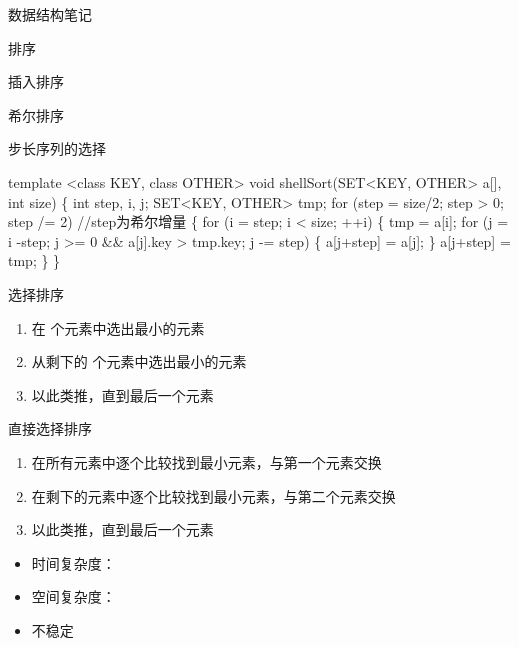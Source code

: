 \documentclass[
  ignorenonframetext,
]{beamer}
\newenvironment{Shaded}{}{}
\newcommand{\NormalTok}[1]{#1}
\providecommand{\tightlist}{%
  \setlength{\itemsep}{0pt}\setlength{\parskip}{0pt}}
\begin{document}
\begin{frame}[fragile]{数据结构笔记}
\begin{block}{排序}
\begin{block}{插入排序}
\begin{block}{希尔排序}
\begin{block}{步长序列的选择}
\begin{Shaded}
\begin{Highlighting}[]
\NormalTok{template \textless{}class KEY, class OTHER\textgreater{}}
\NormalTok{void shellSort(SET\textless{}KEY, OTHER\textgreater{} a[], int size)}
\NormalTok{\{}
\NormalTok{  int step, i, j;}
\NormalTok{  SET\textless{}KEY, OTHER\textgreater{} tmp;}
\NormalTok{  for (step = size/2; step \textgreater{} 0; step /= 2) //step为希尔增量}
\NormalTok{  \{}
\NormalTok{    for (i = step; i \textless{} size; ++i)}
\NormalTok{    \{}
\NormalTok{      tmp = a[i];}
\NormalTok{      for (j = i {-}step; j \textgreater{}= 0 \&\& a[j].key \textgreater{} tmp.key; j {-}= step)}
\NormalTok{      \{}
\NormalTok{        a[j+step] = a[j];}
\NormalTok{      \}}
\NormalTok{      a[j+step] = tmp;}
\NormalTok{    \}}
\NormalTok{\}}
\end{Highlighting}
\end{Shaded}
\end{block}
\end{block}
\end{block}

\begin{block}{选择排序}
\protect{}\label{ux9009ux62e9ux6392ux5e8f}
\begin{enumerate}
\tightlist
\item
  在 {} 个元素中选出最小的元素
\item
  从剩下的 {} 个元素中选出最小的元素
\item
  以此类推，直到最后一个元素
\end{enumerate}

\begin{block}{直接选择排序}
\protect{}\label{ux76f4ux63a5ux9009ux62e9ux6392ux5e8f}
\begin{enumerate}
\tightlist
\item
  在所有元素中逐个比较找到最小元素，与第一个元素交换
\item
  在剩下的元素中逐个比较找到最小元素，与第二个元素交换
\item
  以此类推，直到最后一个元素
\end{enumerate}

\begin{itemize}
\tightlist
\item
  时间复杂度：{}
\item
  空间复杂度：{}
\item
  不稳定
\end{itemize}


\end{block}
\end{block}
\end{block}
\end{frame}
\end{document}
